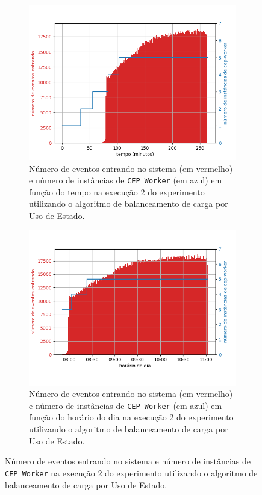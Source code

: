 \begin{figure}[h]
\centering
\begin{subfigure}{0.9\textwidth}
\centering
\includegraphics[width=\textwidth]{figuras/graphics/carga_e_workers_total7-dez-su.png}
\caption{Número de eventos entrando no sistema (em vermelho) e número de instâncias de \texttt{CEP Worker} (em azul) em função do tempo na execução 2 do experimento utilizando o algoritmo de balanceamento de carga por Uso de Estado.}
\label{fig:workers_and_load_total_7-dez-su}
\end{subfigure}%

\begin{subfigure}{\textwidth}
\centering
\includegraphics[width=\textwidth]{figuras/graphics/carga_e_workers_horario7-dez-su.png}
\caption{Número de eventos entrando no sistema (em vermelho) e número de instâncias de \texttt{CEP Worker} (em azul) em função do horário do dia na execução 2 do experimento utilizando o algoritmo de balanceamento de carga por Uso de Estado.}
\label{fig:workers_and_load_SPtrans_7-dez-su}
\end{subfigure}%
\caption{Número de eventos entrando no sistema e número de instâncias de \texttt{CEP Worker} na execução 2 do experimento utilizando o algoritmo de balanceamento de carga por Uso de Estado.}
\end{figure}


